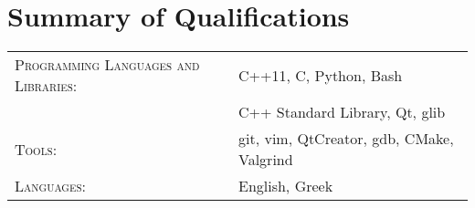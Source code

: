 \documentclass[alan.tex]{subfiles}
\begin{document}
  \section{Summary of Qualifications}
  \begin{tabular}{ll}
    \textsc{Programming Languages and Libraries}:  & C++11, C, Python, Bash\\
     & C++ Standard Library, Qt, glib\\
    \textsc{Tools}: & git, vim, QtCreator, gdb, CMake, Valgrind\\
    \textsc{Languages}: & English, Greek
  \end{tabular}
\end{document}

